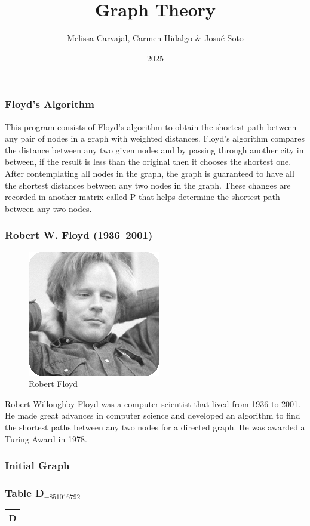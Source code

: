 \documentclass{beamer}
\title{Graph Theory}
\author{Melissa Carvajal, Carmen Hidalgo & Josu\'e Soto}
\institute{Investigaci\'on de Operaciones}
\date{2025}
\begin{document}
\maketitle
\begin{frame}
\frametitle{Floyd's Algorithm}
This program consists of Floyd's algorithm to obtain the shortest path between any pair of nodes in a graph with weighted distances.
Floyd's algorithm compares the distance between any two given nodes and by passing through another city in between, if the result is less than the original then it chooses the shortest one. After contemplating all nodes in the graph, the graph is guaranteed to have all the shortest distances between any two nodes in the graph. These changes are recorded in another matrix called P that helps determine the shortest path between any two nodes.
\end{frame}
\begin{frame}
\frametitle{Robert W. Floyd (1936–2001)}
\begin{figure}
\centering
\includegraphics[width=0.25	extwidth]{floyd.jpg}
\caption{\label{fig:floyd}Robert Floyd}
\end{figure}
Robert Willoughby Floyd was a computer scientist that lived from 1936 to 2001. He made great advances in computer science and developed an algorithm to find the shortest paths between any two nodes for a directed graph. He was awarded a Turing Award in 1978.
\end{frame}
\begin{frame}
\frametitle{Initial Graph}
\begin{center}
\begin{tikzpicture}
\end{tikzpicture}
\end{center}
\end{frame}



\begin{frame}
\frametitle{Table D$_{-851016792}$}
\begin{center}
    \begin{tabular}{|c||}
        \hline
        \textbf{D} \\
        \hline
        \hline
    \end{tabular}
\end{center}


\end{frame}
\end{document}
